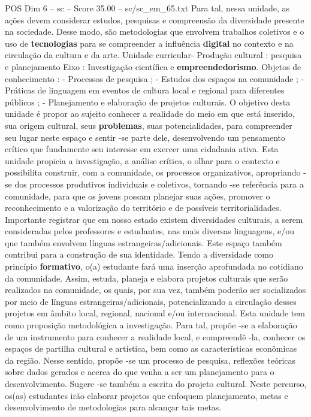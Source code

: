 \begin{textsample}{POS Dim 6 – sc – Score 35.00 – sc/sc\_em\_65.txt}
Para tal, nessa unidade, as ações devem considerar estudos, pesquisas e compreensão da diversidade presente na sociedade.
Desse modo, são metodologias que envolvem trabalhos coletivos e o uso de \textbf{tecnologias} para se compreender a influência \textbf{digital} no contexto e na circulação da cultura e da arte.
Unidade curricular- Produção cultural : pesquisa e planejamento Eixo : Investigação científica e \textbf{empreendedorismo}.
Objetos de conhecimento : - Processos de pesquisa ; - Estudos dos espaços na comunidade ; - Práticas de linguagem em eventos de cultura local e regional para diferentes públicos ; - Planejamento e elaboração de projetos culturais.
O objetivo desta unidade é propor ao sujeito conhecer a realidade do meio em que está inserido, sua origem cultural, seus \textbf{problemas}, suas potencialidades, para compreender seu lugar neste espaço e sentir -se parte dele, desenvolvendo um pensamento crítico que fundamente seu interesse em exercer uma cidadania ativa.
Esta unidade propicia a investigação, a análise crítica, o olhar para o contexto e possibilita construir, com a comunidade, os processos organizativos, apropriando -se dos processos produtivos individuais e coletivos, tornando -se referência para a comunidade, para que os jovens possam planejar suas ações, promover o reconhecimento e a valorização do território e de possíveis territorialidades.
Importante registrar que em nosso estado existem diversidades culturais, a serem consideradas pelos professores e estudantes, nas mais diversas linguagens, e/ou que também envolvem línguas estrangeiras/adicionais.
Este espaço também contribui para a construção de sua identidade.
Tendo a diversidade como princípio \textbf{formativo}, o(a) estudante fará uma inserção aprofundada no cotidiano da comunidade.
Assim, estuda, planeja e elabora projetos culturais que serão realizados na comunidade, os quais, por sua vez, também poderão ser socializados por meio de línguas estrangeiras/adicionais, potencializando a circulação desses projetos em âmbito local, regional, nacional e/ou internacional.
Esta unidade tem como proposição metodológica a investigação.
Para tal, propõe -se a elaboração de um instrumento para conhecer a realidade local, e compreendê -la, conhecer os espaços de partilha cultural e artística, bem como as características econômicas da região.
Nesse sentido, propõe -se um processo de pesquisa, reflexões teóricas sobre dados gerados e acerca do que venha a ser um planejamento para o desenvolvimento.
Sugere -se também a escrita do projeto cultural.
Neste percurso, os(as) estudantes irão elaborar projetos que enfoquem planejamento, metas e desenvolvimento de metodologias para alcançar tais metas.

\end{textsample}

